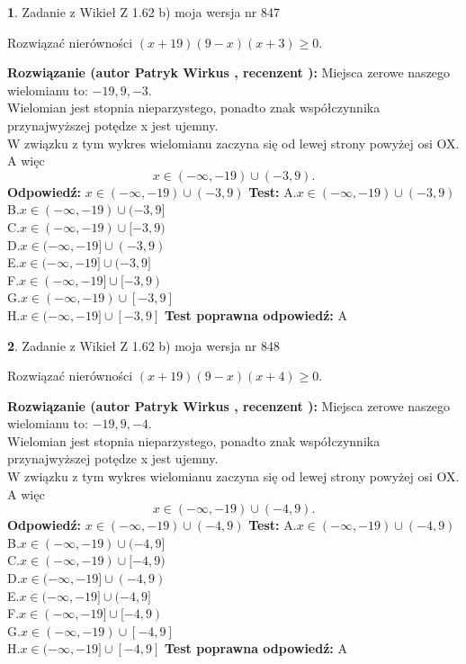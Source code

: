 \documentclass[12pt, a4paper]{article}
\theoremstyle{definition} %
\newtheorem{zad}{}
\newcommand{\zadStart}[1]{\begin{zad}#1\newline}
\newcommand{\zadStop}{\end{zad}}
\newcommand{\rozwStart}[2]{\noindent \textbf{Rozwiązanie (autor #1 , recenzent #2): }\newline}
\newcommand{\rozwStop}{\newline}
\newcommand{\odpStart}{\noindent \textbf{Odpowiedź:}\newline}
\newcommand{\odpStop}{\newline}
\newcommand{\testStart}{\noindent \textbf{Test:}\newline}
\newcommand{\testStop}{\newline}
\newcommand{\kluczStart}{\noindent \textbf{Test poprawna odpowiedź:}\newline}
\newcommand{\kluczStop}{\newline}
\begin{document}
\zadStart{Zadanie z Wikieł Z 1.62 b) moja wersja nr 847}

Rozwiązać nierówności $(x+19)(9-x)(x+3)\ge0$.
\zadStop
\rozwStart{Patryk Wirkus}{}
Miejsca zerowe naszego wielomianu to: $-19, 9, -3$.\\
Wielomian jest stopnia nieparzystego, ponadto znak współczynnika przy\linebreak najwyższej potędze x jest ujemny.\\ W związku z tym wykres wielomianu zaczyna się od lewej strony powyżej osi OX. A więc $$x \in (-\infty,-19) \cup (-3,9).$$
\rozwStop
\odpStart
$x \in (-\infty,-19) \cup (-3,9)$
\odpStop
\testStart
A.$x \in (-\infty,-19) \cup (-3,9)$\\
B.$x \in (-\infty,-19) \cup (-3,9]$\\
C.$x \in (-\infty,-19) \cup [-3,9)$\\
D.$x \in (-\infty,-19] \cup (-3,9)$\\
E.$x \in (-\infty,-19] \cup (-3,9]$\\
F.$x \in (-\infty,-19] \cup [-3,9)$\\
G.$x \in (-\infty,-19) \cup [-3,9]$\\
H.$x \in (-\infty,-19] \cup [-3,9]$
\testStop
\kluczStart
A
\kluczStop



\zadStart{Zadanie z Wikieł Z 1.62 b) moja wersja nr 848}

Rozwiązać nierówności $(x+19)(9-x)(x+4)\ge0$.
\zadStop
\rozwStart{Patryk Wirkus}{}
Miejsca zerowe naszego wielomianu to: $-19, 9, -4$.\\
Wielomian jest stopnia nieparzystego, ponadto znak współczynnika przy\linebreak najwyższej potędze x jest ujemny.\\ W związku z tym wykres wielomianu zaczyna się od lewej strony powyżej osi OX. A więc $$x \in (-\infty,-19) \cup (-4,9).$$
\rozwStop
\odpStart
$x \in (-\infty,-19) \cup (-4,9)$
\odpStop
\testStart
A.$x \in (-\infty,-19) \cup (-4,9)$\\
B.$x \in (-\infty,-19) \cup (-4,9]$\\
C.$x \in (-\infty,-19) \cup [-4,9)$\\
D.$x \in (-\infty,-19] \cup (-4,9)$\\
E.$x \in (-\infty,-19] \cup (-4,9]$\\
F.$x \in (-\infty,-19] \cup [-4,9)$\\
G.$x \in (-\infty,-19) \cup [-4,9]$\\
H.$x \in (-\infty,-19] \cup [-4,9]$
\testStop
\kluczStart
A
\kluczStop
\end{document}
